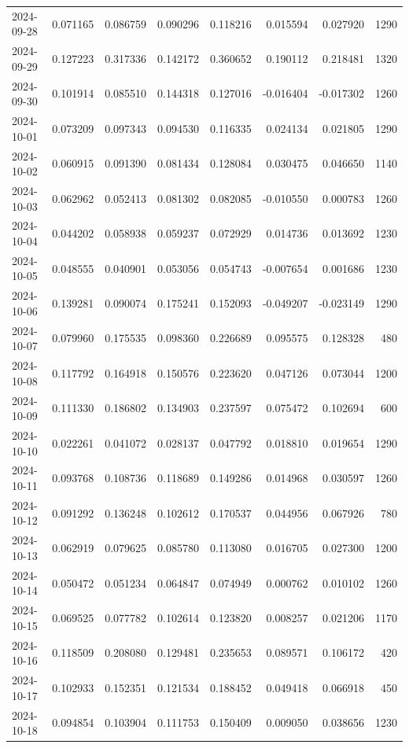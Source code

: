\begin{tabular}{lrrrrrrr}
2024-09-28 & 0.071165 & 0.086759 & 0.090296 & 0.118216 & 0.015594 & 0.027920 & 1290 \\
2024-09-29 & 0.127223 & 0.317336 & 0.142172 & 0.360652 & 0.190112 & 0.218481 & 1320 \\
2024-09-30 & 0.101914 & 0.085510 & 0.144318 & 0.127016 & -0.016404 & -0.017302 & 1260 \\
2024-10-01 & 0.073209 & 0.097343 & 0.094530 & 0.116335 & 0.024134 & 0.021805 & 1290 \\
2024-10-02 & 0.060915 & 0.091390 & 0.081434 & 0.128084 & 0.030475 & 0.046650 & 1140 \\
2024-10-03 & 0.062962 & 0.052413 & 0.081302 & 0.082085 & -0.010550 & 0.000783 & 1260 \\
2024-10-04 & 0.044202 & 0.058938 & 0.059237 & 0.072929 & 0.014736 & 0.013692 & 1230 \\
2024-10-05 & 0.048555 & 0.040901 & 0.053056 & 0.054743 & -0.007654 & 0.001686 & 1230 \\
2024-10-06 & 0.139281 & 0.090074 & 0.175241 & 0.152093 & -0.049207 & -0.023149 & 1290 \\
2024-10-07 & 0.079960 & 0.175535 & 0.098360 & 0.226689 & 0.095575 & 0.128328 & 480 \\
2024-10-08 & 0.117792 & 0.164918 & 0.150576 & 0.223620 & 0.047126 & 0.073044 & 1200 \\
2024-10-09 & 0.111330 & 0.186802 & 0.134903 & 0.237597 & 0.075472 & 0.102694 & 600 \\
2024-10-10 & 0.022261 & 0.041072 & 0.028137 & 0.047792 & 0.018810 & 0.019654 & 1290 \\
2024-10-11 & 0.093768 & 0.108736 & 0.118689 & 0.149286 & 0.014968 & 0.030597 & 1260 \\
2024-10-12 & 0.091292 & 0.136248 & 0.102612 & 0.170537 & 0.044956 & 0.067926 & 780 \\
2024-10-13 & 0.062919 & 0.079625 & 0.085780 & 0.113080 & 0.016705 & 0.027300 & 1200 \\
2024-10-14 & 0.050472 & 0.051234 & 0.064847 & 0.074949 & 0.000762 & 0.010102 & 1260 \\
2024-10-15 & 0.069525 & 0.077782 & 0.102614 & 0.123820 & 0.008257 & 0.021206 & 1170 \\
2024-10-16 & 0.118509 & 0.208080 & 0.129481 & 0.235653 & 0.089571 & 0.106172 & 420 \\
2024-10-17 & 0.102933 & 0.152351 & 0.121534 & 0.188452 & 0.049418 & 0.066918 & 450 \\
2024-10-18 & 0.094854 & 0.103904 & 0.111753 & 0.150409 & 0.009050 & 0.038656 & 1230 \\

\end{tabular}

